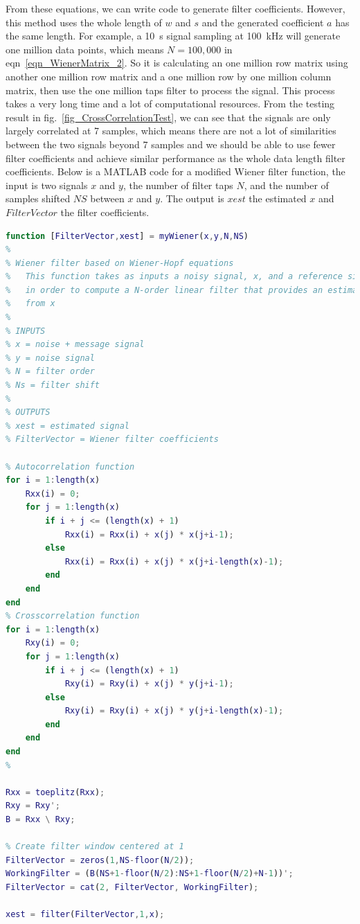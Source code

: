 From these equations, we can write code to generate filter coefficients.  However, this method uses the whole length of $w$ and $s$ and the generated coefficient $a$ has the same length.  For example, a \qty{10}{s} signal sampling at \qty{100}{kHz} will generate one million data points, which means $N=100,000$ in eqn~\ref{eqn_WienerMatrix_2}.  So it is calculating an one million row matrix using another one million row matrix and a one million row by one million column matrix, then use the one million taps filter to process the signal.  This process takes a very long time and a lot of computational resources.  From the testing result in fig.~\ref{fig_CrossCorrelationTest}, we can see that the signals are only largely correlated at 7 samples, which means there are not a lot of similarities between the two signals beyond 7 samples and we should be able to use fewer filter coefficients and achieve similar performance as the whole data length filter coefficients.  Below is a MATLAB code for a modified Wiener filter function, the input is two signals $x$ and $y$, the number of filter taps $N$, and the number of samples shifted $NS$ between $x$ and $y$.  The output is $xest$ the estimated $x$ and $FilterVector$ the filter coefficients.

\begin{lstlisting}[language=matlab]
function [FilterVector,xest] = myWiener(x,y,N,NS)
%
% Wiener filter based on Wiener-Hopf equations
%   This function takes as inputs a noisy signal, x, and a reference signal, y,
%   in order to compute a N-order linear filter that provides an estimate of y
%   from x
%  
% INPUTS
% x = noise + message signal
% y = noise signal
% N = filter order
% Ns = filter shift
%
% OUTPUTS
% xest = estimated signal
% FilterVector = Wiener filter coefficients

% Autocorrelation function
for i = 1:length(x)
    Rxx(i) = 0;
    for j = 1:length(x)
        if i + j <= (length(x) + 1)
            Rxx(i) = Rxx(i) + x(j) * x(j+i-1);
        else
            Rxx(i) = Rxx(i) + x(j) * x(j+i-length(x)-1);
        end
    end
end
% Crosscorrelation function
for i = 1:length(x)
    Rxy(i) = 0;
    for j = 1:length(x)
        if i + j <= (length(x) + 1)
            Rxy(i) = Rxy(i) + x(j) * y(j+i-1);
        else
            Rxy(i) = Rxy(i) + x(j) * y(j+i-length(x)-1);
        end
    end
end
%

Rxx = toeplitz(Rxx);
Rxy = Rxy';
B = Rxx \ Rxy;

% Create filter window centered at 1
FilterVector = zeros(1,NS-floor(N/2));
WorkingFilter = (B(NS+1-floor(N/2):NS+1-floor(N/2)+N-1))';
FilterVector = cat(2, FilterVector, WorkingFilter);

xest = filter(FilterVector,1,x);
\end{lstlisting}

